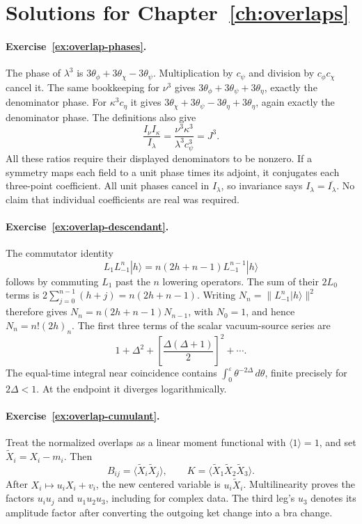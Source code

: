 \section{Solutions for Chapter~\ref{ch:overlaps}}

\paragraph{Exercise~\ref{ex:overlap-phases}.}
\label{sol:ex:overlap-phases}
The phase of $\lambda^3$ is
$3\theta_\phi+3\theta_\chi-3\theta_\psi$. Multiplication by
$c_\psi$ and division by $c_\phi c_\chi$ cancel it. The same
bookkeeping for $\nu^3$ gives
$3\theta_\phi+3\theta_\psi+3\theta_\eta$, exactly the
denominator phase. For $\kappa^3c_\eta$ it gives
$3\theta_\chi+3\theta_\psi-3\theta_\eta+3\theta_\eta$,
again exactly the denominator phase. The definitions also give
\[
 \frac{I_\nu I_\kappa}{I_\lambda}
 =\frac{\nu^3\kappa^3}{\lambda^3c_\psi^3}=J^3.
\]
All these ratios require their displayed denominators to be nonzero.
If a symmetry maps each field to a unit phase times its adjoint,
it conjugates each three-point coefficient. All unit phases
cancel in $I_\lambda$, so invariance says
$I_\lambda=\overline{I_\lambda}$. No claim that individual
coefficients are real was required.



\paragraph{Exercise~\ref{ex:overlap-descendant}.}
\label{sol:ex:overlap-descendant}
The commutator identity
\[
 L_1L_{-1}^n|h\rangle
 =n(2h+n-1)L_{-1}^{n-1}|h\rangle
\]
follows by commuting $L_1$ past the $n$ lowering operators.
The sum of their $2L_0$ terms is
$2\sum_{j=0}^{n-1}(h+j)=n(2h+n-1)$.
Writing $N_n=\|L_{-1}^n|h\rangle\|^2$ therefore gives
$N_n=n(2h+n-1)N_{n-1}$, with $N_0=1$, and hence
$N_n=n!(2h)_n$. The first three
terms of the scalar vacuum-source series are
\[
 1+\Delta^2+
 \left[\frac{\Delta(\Delta+1)}2\right]^2+\cdots.
\]
The equal-time integral near coincidence contains
$\int_0^\varepsilon\theta^{-2\Delta}\,d\theta$, finite
precisely for $2\Delta<1$. At the endpoint it diverges
logarithmically.



\paragraph{Exercise~\ref{ex:overlap-cumulant}.}
\label{sol:ex:overlap-cumulant}
Treat the normalized overlaps as a linear moment functional
with $\langle1\rangle=1$, and set $\widetilde X_i=X_i-m_i$.
Then
\[
 B_{ij}=\langle\widetilde X_i\widetilde X_j\rangle,
 \qquad K=\langle\widetilde X_1\widetilde X_2\widetilde X_3\rangle.
\]
After $X_i\mapsto u_iX_i+v_i$, the new centered variable is
$u_i\widetilde X_i$. Multilinearity proves the factors
$u_iu_j$ and $u_1u_2u_3$, including for complex data. The
third leg's $u_3$ denotes its amplitude factor after converting
the outgoing ket change into a bra change.


